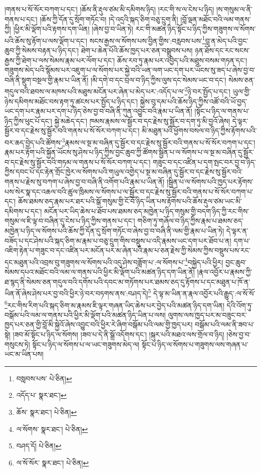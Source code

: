 །གནས་པ་སོ་སོར་བཀག་པ་དང་། །ཆོས་ནི་རྡུལ་ཙམ་མི་དམིགས་ཉིད། །རང་གི་ས་ལ་ངེས་པ་ཉིད། །ས་གསུམ་ལ་ནི་གནས་པ་དང་། །ཆོས་ཀྱི་དོན་དུ་སྲོག་གཏོང་བ། །དེ་འདྲའི་སྐད་ཅིག་བཅུ་དྲུག་ནི། །བློ་ལྡན་མཐོང་བའི་ལམ་གནས་ཀྱི། །ཕྱིར་མི་ལྡོག་པའི་རྟགས་དག་ཡིན། །ཞེས་བྱ་བ་ཡིན་ཏེ། རང་གི་མཚན་ཉིད་སྟོང་པ་ཉིད་ཀྱིས་གཟུགས་ལ་སོགས་པའི་ཆོས་སུ་རྟོག་པ་ལས་ལྡོག་པ་དང་། སངས་རྒྱས་ལ་སོགས་པས་བྱིན་གྱིས་:བརླབས་པས་\footnote{བསླབས་པས་  པེ་ཅིན། }བླ་ན་མེད་པའི་བྱང་ཆུབ་ཀྱི་སེམས་བརྟན་པ་ཉིད་དང་། ཐེག་པ་ཆེན་པོའི་ཆོས་ཁྱད་པར་ཅན་བསྒྲུབས་པས། ཉན་ཐོས་དང་རང་སངས་རྒྱས་ཀྱི་ཐེག་པ་ལས་སེམས་རྣམ་པར་ལོག་པ་དང་། ཆོས་རབ་ཏུ་རྣམ་པར་འབྱེད་པའི་མཐུས་བསམ་གཏན་དང་། གཟུགས་མེད་པའི་སྙོམས་པར་འཇུག་པ་ལ་སོགས་པར་སྐྱེ་བའི་ཡན་ལག་ཡང་དག་པར་ཡོངས་སུ་ཟད་པ་ཞེས་བྱ་བ་བཞི་ནི་སྡུག་བསྔལ་གྱི་རྣམ་པ་ཡིན་ནོ། །མི་དགེ་བ་དང་བྲལ་བ་ཉིད་ཀྱིས་ལུས་དང་སེམས་ཡང་བ་དང་། སེམས་ཅན་གདུལ་བའི་ཐབས་ལ་མཁས་པའི་མཐུས་མངོན་པར་ཞེན་པ་མེད་པར་:འདོད་པ་ལ་\footnote{འདོད་པ་  སྣར་ཐང་། }ཉེ་བར་སྤྱོད་པ་དང་། ཡུལ་གྱི་ཉེས་དམིགས་མཐོང་བས་རྟག་ཏུ་ཚངས་པར་སྤྱོད་པ་ཉིད་དང་། སྐྱེས་བུ་དམ་པའི་ཆོས་ཉིད་ཀྱིས་འཚོ་བའི་ཡོ་བྱད་ཡང་དག་པར་རྣམ་པར་དག་པ་ཉིད་ཅེས་བྱ་བ་བཞི་ནི་ཀུན་འབྱུང་བའི་རྣམ་པ་ཡིན་ནོ། །སྟོང་པ་ཉིད་ལ་གནས་པ་ཉིད་ཀྱིས་ཕུང་པོ་དང་། སྐྱེ་མཆེད་དང་། ཁམས་རྣམས་ལ་སྦྱོར་བ་དང་རྗེས་སུ་སྦྱོར་བ་དག་ཏུ་མི་བྱའོ་ཞེས། དེ་ལྟར་སྦྱོར་བ་དང་རྗེས་སུ་སྦྱོར་བའི་གནས་པ་སོ་སོར་བཀག་པ་དང་། མི་མཐུན་པའི་ཕྱོགས་བསལ་བ་ཉིད་ཀྱིས་རྟོགས་པའི་བར་ཆད་བྱེད་པའི་ཚོགས་\footnote{ཆོས་  སྣར་ཐང་།  པེ་ཅིན། }རྣམས་ལ་སྔ་མ་བཞིན་དུ་སྦྱོར་བ་དང་རྗེས་སུ་སྦྱོར་བའི་གནས་པ་སོ་སོར་བཀག་པ་དང་། རྣམ་པར་རྟོག་པའི་སྐྱོན་ཡོངས་སུ་ཤེས་པ་ཉིད་ཀྱིས་བྱང་ཆུབ་ཀྱི་ཚོགས་སྦྱིན་པ་ལ་སོགས་པ་ལ་སྔ་མ་བཞིན་དུ་སྦྱོར་བ་དང་རྗེས་སུ་སྦྱོར་བའི་གཏམ་ལ་གནས་པ་སོ་སོར་བཀག་པ་དང་། གཟུང་བ་དང་འཛིན་པ་དག་སྤང་བར་བྱ་བ་ཉིད་ཀྱིས་དབང་པོ་དང་རྟེན་གྲོང་ཁྱེར་ལ་སོགས་པའི་གཡུལ་འགྱེད་པ་སྔ་མ་བཞིན་དུ་སྦྱོར་བ་དང་རྗེས་སུ་སྦྱོར་བའི་གནས་པ་རྗེས་སུ་བཀག་པ་ཞེས་བྱ་བ་བཞི་ནི་འགོག་པའི་རྣམ་པ་ཡིན་ནོ། །སྦྱིན་པ་ལ་སོགས་པའི་ཁྱད་པར་རྟོགས་པས་སེར་སྣ་དང་འཆལ་བའི་ཚུལ་ཁྲིམས་ལ་སོགས་པ་ལ་སྦྱོར་བ་དང་རྗེས་སུ་སྦྱོར་བའི་གནས་པ་སོ་སོར་བཀག་པ་དང་། ཆོས་ཐམས་ཅད་རྣམ་པར་ཐར་པའི་སྒོ་གསུམ་གྱི་ངོ་བོ་ཉིད་ཡིན་པས་རྟོགས་པའི་ཆོས་རྡུལ་ཙམ་ཡང་མི་དམིགས་པ་དང་། མངོན་པར་ཡིད་ཆེས་པ་ཐོབ་པས་ཐམས་ཅད་མཁྱེན་པ་ཉིད་གསུམ་གྱི་བདག་ཉིད་ཀྱི་རང་གིས་གསུམ་ལ་ཇི་ལྟ་བ་བཞིན་དུ་ངེས་པ་ཉིད་ཀྱིས་གནས་པ་དང་། གཅིག་ཏུ་གཞོལ་བ་ཉིད་ཀྱིས་རྣམ་པ་ཐམས་ཅད་མཁྱེན་པ་ཉིད་ལ་སོགས་པའི་ཆོས་ཀྱི་དོན་དུ་སྲོག་གཏོང་བ་ཞེས་བྱ་བ་བཞི་ནི་ལམ་གྱི་རྣམ་པ་ཡིན་ཏེ། དེ་ལྟར་ན་བཟོད་པ་དང་ཤེས་པའི་སྐད་ཅིག་མ་རྣམ་པ་བཅུ་དྲུག་གིས་བསྡུས་པ་འདི་རྣམས་ཡང་དག་པར་ཐོབ་པ་ན། དག་པ་འཇིག་རྟེན་པ་གཟུང་བ་དང་འཛིན་པར་མངོན་པར་མ་ཞེན་པའི་རྣམ་པ་ཅན་རྗེས་ཀྱི་སེམས་ཀྱིས་བསྡུས་པས་རང་དང་མཐུན་པའི་འབྲས་བུ་གཟུགས་ལ་སོགས་པའི་འདུ་ཤེས་བཟློག་པ་:ལ་སོགས་པ་\footnote{ལ་སོགས་  སྣར་ཐང་།  པེ་ཅིན། }བསྐྱེད་པའི་ཕྱིར། བྱང་ཆུབ་སེམས་དཔའ་མཐོང་བའི་ལམ་ལ་གནས་པའི་ཕྱིར་མི་ལྡོག་པའི་མཚན་ཉིད་དག་ཡིན་ནོ། །རྣལ་འབྱོར་པ་རྣམས་ཀྱི་ཐ་སྙད་ནི་སེམས་ཅན་གདུལ་བའི་དགོས་པའི་དབང་མ་གཏོགས་པར་ཐམས་ཅད་དུ་རྟོགས་པ་དང་མཐུན་པ་ཁོ་ན་ཡིན་ནོ་ཞེས་ཤེས་པར་བྱ་བའི་ཕྱིར་ཉེ་བར་བཏགས་ནས་:བཤད་དེ།\footnote{བཤད་དོ།  པེ་ཅིན། } དེ་ལྟ་མ་ཡིན་ན་རྣལ་འབྱོར་པའི་རྒྱུད་:ལ་སོ་སོ་\footnote{ལ་སོ་སོར་  སྣར་ཐང་།  པེ་ཅིན། }རང་གིས་རིག་པའི་སྐད་ཅིག་མ་རྣམས་ཇི་ལྟར་གཞན་ཡིད་ཆེས་པར་བྱེད་པའི་མཚན་ཉིད་དག་ཡིན། དེའི་འོག་ཏུ་བསྒོམ་པའི་ལམ་ལ་གནས་པའི་ཕྱིར་མི་ལྡོག་པའི་མཚན་ཉིད་ཡིན་པ་ལས། ལུགས་ལས་ཁྱད་པར་མ་བཟུང་བར་ཁྱད་པར་ཅན་གྱི་བློ་མི་སྐྱེའོ་ཞེས་འབྱུང་བའི་ཕྱིར་རེ་ཞིག་བསྒོམ་པའི་ལམ་གྱི་ཁྱད་པར། བསྒོམ་པའི་ལམ་ནི་ཟབ་པ་སྟེ། །ཟབ་མོ་སྟོང་པ་ཉིད་ལ་སོགས། །ཟབ་པ་དེ་ནི་སྒྲོ་འདོགས་དང་། །སྐུར་པའི་མཐའ་ལས་གྲོལ་བ་ཉིད། །ཅེས་བྱ་བ་གསུངས་ཏེ། སྟོང་པ་ཉིད་ལ་སོགས་པ་ལ་ཡང་གཟུགས་མེད་ལ། སྟོང་པ་ཉིད་ལ་སོགས་པ་གཟུགས་ལས་གཞན་པ་ཡང་མ་ཡིན་པས། 